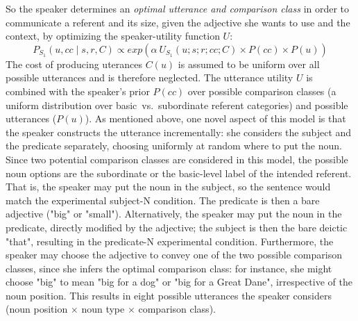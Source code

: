 So the speaker determines an \emph{optimal utterance and comparison class} in order to communicate a referent and its size, given the adjective she wants to use and the context, by optimizing the speaker-utility function $U$:
\begin{equation}
P_{S_1} (u, cc \mid s, r, C)  \propto exp(\alpha \: U_{S_1}(u; s; r; cc; C) \times P(cc) \times P(u)) 
\end{equation}
The cost of producing uterances $C(u)$ is assumed to be uniform over all possible utterances and is therefore neglected. The utterance utility $U$ is combined with the speaker's prior $P(cc)$ over possible comparison classes (a uniform distribution over basic~vs.~subordinate referent categories) and possible utterances ($P(u)$). 
As mentioned above, one novel aspect of this model is that the speaker constructs the utterance incrementally: she considers the subject and the predicate separately, choosing uniformly at random where to put the noun. Since two potential comparison classes are considered in this model, the possible noun options are the subordinate or the basic-level label of the intended referent. That is, the speaker may put the noun in the subject, so the sentence would match the experimental subject-N condition. The predicate is then a bare adjective ("big" or "small"). Alternatively, the speaker may put the noun in the predicate, directly modified by the adjective; the subject is then the bare deictic "that", resulting in the predicate-N experimental condition. Furthermore, the speaker may choose the adjective to convey one of the two possible comparison classes, since she infers the optimal comparison class: for instance, she might choose "big" to mean "big for a dog" or "big for a Great Dane", irrespective of the noun position. This results in eight possible utterances the speaker considers (noun position $\times$ noun type $\times$ comparison class).  


